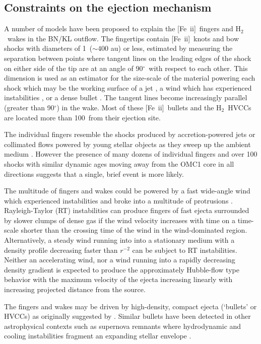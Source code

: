 \documentclass{aa}
\newcommand\arcdeg{\mbox{$^\circ$}\xspace}  %
\newcommand{\Feii}{[Fe~{\sc ii}]}
\newcommand{\hh}{\ensuremath{\textrm{H}_{2}}}			%
\begin{document}
\subsection{Constraints on the ejection mechanism}

A number of models have been proposed to explain the \Feii\  fingers and \hh\ 
wakes in the  BN/KL outflow.     The fingertips contain  \Feii\ knots and bow shocks  
with diameters of  1\arcsec\ ($\sim400$ au) or less,  estimated by measuring the 
separation  between points  where tangent lines on the leading edges of the shock 
on either side of the tip are at an angle of 90\arcdeg\  with respect to each other.    
This dimension is used as an estimator for the size-scale of the material powering 
each shock which may be the working surface of a jet \citep{SmithRosen2007},  
a wind which has experienced instabilities \citep{StoneXuMundy1995}, 
or a dense bullet \citep{AllenBurton93}.    The tangent lines become increasingly 
parallel (greater than  90\arcdeg ) in the wake. Most of these \Feii\ bullets and 
the \hh\ HVCCs  are located more than  100\arcsec\ from their ejection site.    

The individual fingers resemble the shocks  produced by accretion-powered jets or 
collimated flows powered by young stellar objects as they sweep up the  ambient  
medium \citep{ReipurthBally2001}.   However the presence of many dozens of
individual fingers and over 100 shocks with similar dynamic ages moving
away from the OMC1 core in all directions suggests that a single, brief event 
is more likely.   
 
The multitude of fingers and wakes  could be powered by a  fast  wide-angle 
wind which experienced instabilities  and  broke into a multitude of  protrusions 
\citep{StoneXuMundy1995,McCaughrean_MacLow1997}.    Rayleigh-Taylor (RT)
instabilities can produce fingers of fast ejecta surrounded by slower clumps of dense 
gas if the wind velocity increases with time on a time-scale shorter than the 
crossing time of the wind in the wind-dominated region.     Alternatively,   
a steady wind running into into a stationary  medium with a density profile  
decreasing faster than $r^{-2}$ can be subject to RT instabilities.   Neither an 
accelerating wind, nor a wind running into a rapidly decreasing  density gradient 
is  expected to produce the approximately Hubble-flow type  behavior with the  
maximum velocity of the ejecta  increasing linearly with increasing 
projected  distance from the source.    

The  fingers and wakes may be driven by high-density, compact ejecta
(`bullets'  or HVCCs)  as originally suggested by \citet{AllenBurton93}.    
Similar bullets have been detected in other astrophysical contexts such
as supernova remnants where hydrodynamic and cooling instabilities fragment
an expanding stellar envelope \citep{Fesen2011,MilisavljevicFesen2013}.  %
\end{document}
